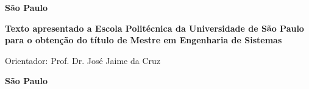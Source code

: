 \pagestyle{empty}

\begin{titlepage}


\begin{center}
{\LARGE \nomedoaluno}
\par
\vspace{200pt}
{\Huge \titulo}
\par
\vfill
\textbf{{\large São Paulo}\\
{\large \the\year}}
\end{center}
\end{titlepage}

\cleardoublepage

\pagestyle{fancy}



\thispagestyle{empty}

\begin{center}
{\LARGE \nomedoaluno}
\par
\vspace{200pt}
{\Huge \titulo}
\end{center}
\par
\vspace{90pt}
\hspace*{175pt}\parbox{7.6cm}{{\large  \textbf{Texto apresentado a Escola Politécnica da Universidade de São Paulo para o obtenção do título de Mestre em Engenharia de Sistemas}}}
\par
\vspace{1em}
\hspace*{175pt}\parbox{7.6cm}{{\large Orientador: Prof. Dr. José Jaime da Cruz}}

\par
\vfill
\begin{center}
\textbf{{\large São Paulo}\\
{\large \the\year}}
\end{center}


